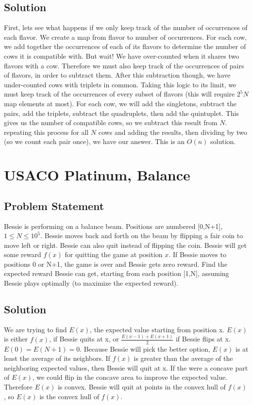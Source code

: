\documentclass{article}
\begin{document}
\subsection{Solution}
    First, lets see what happens if we only keep track of the number of occurrences of each flavor. We create a map from flavor to number of occurrences. For each cow, we add together the occurrences of each of its flavors to determine the number of cows it is compatible with. But wait! We have over-counted when it shares two flavors with a cow. Therefore we must also keep track of the occurrences of pairs of flavors, in order to subtract them. After this subtraction though, we have under-counted cows with triplets in common. Taking this logic to its limit, we must keep track of the occurrences of every subset of flavors (this will require $2^5N$ map elements at most). For each cow, we will add the singletons, subtract the pairs, add the triplets, subtract the quadruplets, then add the quintuplet. This gives us the number of compatible cows, so we subtract this result from $N$. repeating this process for all $N$ cows and adding the results, then dividing by two (so we count each pair once), we have our answer. This is an $O(n)$ solution.
        

\section{USACO Platinum, Balance}
\subsection{Problem Statement}
    Bessie is performing on a balance beam. Positions are numbered [0,N+1], $1\leq N\leq 10^5$. Bessie moves back and forth on the beam by flipping a fair coin to move left or right.  Bessie can also quit instead of flipping the coin. Bessie will get some reward $f(x)$ for quitting the game at position $x$. If Bessie moves to positions 0 or N+1, the game is over and Bessie gets zero reward.  Find the expected reward Bessie can get, starting from each position [1,N], assuming Bessie plays optimally (to maximize the expected reward).
    
\subsection{Solution}
    We are trying to find $E(x)$, the expected value starting from position x. $E(x)$ is either $f(x)$, if Bessie quits at x, or $\frac{E(x-1)+E(x+1)}{2}$ if Bessie flips at x. $E(0)=E(N+1)=0$. Because Bessie will pick the better option, $E(x)$ is at least the average of its neighbors.  If $f(x)$ is greater than the average of the neighboring expected values, then Bessie will quit at x. If the were a concave part of $E(x)$, we could flip in the concave area to improve the expected value.  Therefore $E(x)$ is convex. Bessie will quit at points in the convex hull of $f(x)$, so $E(x)$ is the convex hull of $f(x)$.
    
\end{document}
